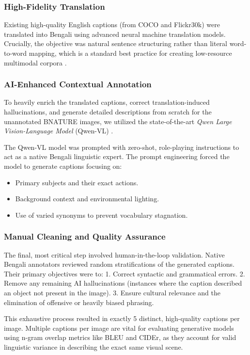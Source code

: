 \documentclass[conference]{IEEEtran}
\begin{document}
\subsubsection{High-Fidelity Translation}
Existing high-quality English captions (from COCO and Flickr30k) were translated into Bengali using advanced neural machine translation models. Crucially, the objective was natural sentence structuring rather than literal word-to-word mapping, which is a standard best practice for creating low-resource multimodal corpora \cite{islam2025generative}.

\subsubsection{AI-Enhanced Contextual Annotation}
To heavily enrich the translated captions, correct translation-induced hallucinations, and generate detailed descriptions from scratch for the unannotated BNATURE images, we utilized the state-of-the-art \textit{Qwen Large Vision-Language Model} (Qwen-VL) \cite{bai2023qwenvl, mahmud2025qwen}. 

The Qwen-VL model was prompted with zero-shot, role-playing instructions to act as a native Bengali linguistic expert. The prompt engineering forced the model to generate captions focusing on:
\begin{itemize}
    \item Primary subjects and their exact actions.
    \item Background context and environmental lighting.
    \item Use of varied synonyms to prevent vocabulary stagnation.
\end{itemize}

\subsubsection{Manual Cleaning and Quality Assurance}
The final, most critical step involved human-in-the-loop validation. Native Bengali annotators reviewed random stratifications of the generated captions. Their primary objectives were to:
1. Correct syntactic and grammatical errors.
2. Remove any remaining AI hallucinations (instances where the caption described an object not present in the image).
3. Ensure cultural relevance and the elimination of offensive or heavily biased phrasing.

This exhaustive process resulted in exactly 5 distinct, high-quality captions per image. Multiple captions per image are vital for evaluating generative models using n-gram overlap metrics like BLEU and CIDEr, as they account for valid linguistic variance in describing the exact same visual scene.
\end{document}
